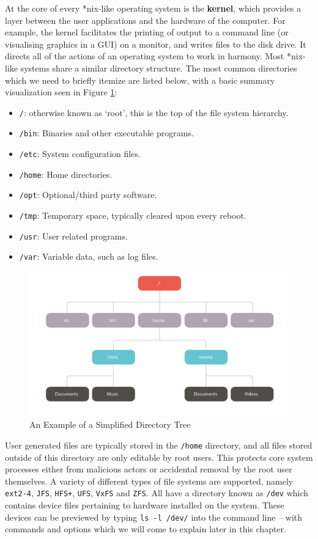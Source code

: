 \documentclass[11pt]{article}
\begin{document}
At the core of every *nix-like operating system is the \textbf{kernel}, which provides a layer between the user applications and the hardware of the computer. For example, the kernel facilitates the printing of output to a command line (or visualising graphics in a GUI) on a monitor, and writes files to the disk drive. It directs all of the actions of an operating system to work in harmony. Most *nix-like systems share a similar directory structure. The most common directories which we need to briefly itemize are listed below, with a basic summary visualization seen in Figure \ref{directorytree}:

\begin{itemize}
\item \texttt{/}: otherwise known as `root', this is the top of the file system hierarchy.
\item \texttt{/bin}: Binaries and other executable programs.
\item \texttt{/etc}: System configuration files.
\item \texttt{/home}: Home directories.
\item \texttt{/opt}: Optional/third party software.
\item \texttt{/tmp}: Temporary space, typically cleared upon every reboot.
\item \texttt{/usr}: User related programs.
\item \texttt{/var}: Variable data, such as log files.
\end{itemize}

\begin{figure}[!t]
\caption{An Example of a Simplified Directory Tree}\label{directorytree}
\centering
\includegraphics[width=1\textwidth]{Infographic2}
\end{figure}

User generated files are typically stored in the \texttt{/home} directory, and all files stored outside of this directory are only editable by root users. This protects core system processes either from malicious actors or accidental removal by the root user themselves. A variety of different types of file systems are supported, namely \texttt{ext2-4}, \texttt{JFS}, \texttt{HFS+}, \texttt{UFS}, \texttt{VxFS} and \texttt{ZFS}.  All have a directory known as \texttt{/dev} which contains device files pertaining to hardware installed on the system. These devices can be previewed by typing \texttt{ls -l /dev/} into the command line -- with commands and options which we will come to explain later in this chapter. 
\end{document}
